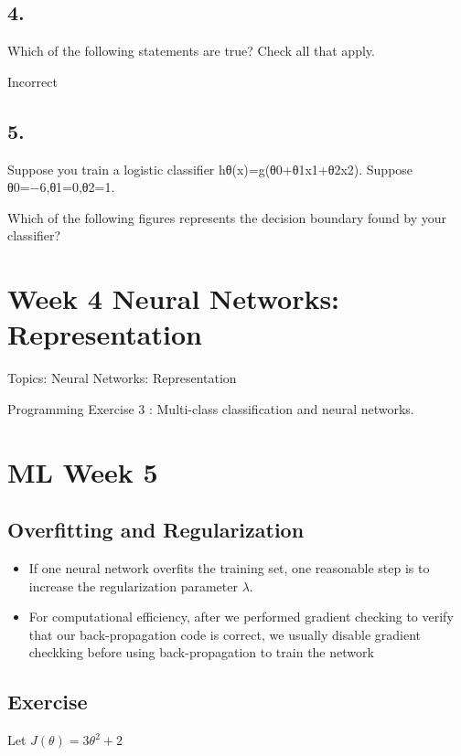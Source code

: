 \subsection{ 4. }
Which of the following statements are true? Check all that apply.

Incorrect
\subsection{ 5. }
Suppose you train a logistic classifier hθ(x)=g(θ0+θ1x1+θ2x2). 
Suppose θ0=−6,θ1=0,θ2=1. 

Which of the following figures represents the decision boundary found by your classifier?


\newpage
\section{Week 4 Neural Networks: Representation}


Topics: Neural Networks: Representation

Programming Exercise 3 : Multi-class classification and neural networks.


\section{ML Week 5}
\subsection*{Overfitting and Regularization}

\begin{itemize}
\item If one neural network overfits the training set, one reasonable step is to
increase the regularization parameter $\lambda$.
\item For computational efficiency, after we performed gradient checking to verify that our back-propagation 
code is correct, we usually disable gradient checkking before using back-propagation to train
the network
\end{itemize}

\subsection*{Exercise}
Let $ J(\theta) = 3\theta^2 + 2$

